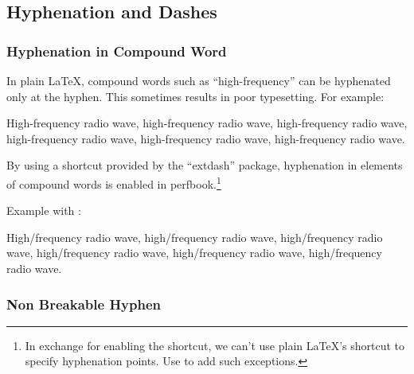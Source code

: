 \subsection{Hyphenation and Dashes}
\label{sec:app:styleguide:Hyphenation and Dashes}

\subsubsection{Hyphenation in Compound Word}
\label{sec:app:styleguide:Hyphenation in Compound Word}

In plain \LaTeX, compound words such as ``high-frequency''
can be hyphenated only at the hyphen. This sometimes results
in poor typesetting. For example:

\begin{center}\begin{minipage}{2.55in}\vspace{0.6\baselineskip}
  High-frequency radio wave, high-frequency radio wave,
  high-frequency radio wave, high-frequency radio wave,
  high-frequency radio wave, high-frequency radio wave.
\vspace{0.6\baselineskip}\end{minipage}\end{center}

By using a shortcut \qco{\\-/} provided by the
``extdash'' package, hyphenation in elements of compound
words is enabled in perfbook.\footnote{
  In exchange for enabling the shortcut, we can't use plain
  \LaTeX's shortcut \qco{\\-} to specify hyphenation points.
  Use  to add such exceptions.
}

Example with \qco{\\-/}:

\begin{center}\begin{minipage}{2.55in}\vspace{0.6\baselineskip}
  High\-/frequency radio wave, high\-/frequency radio wave,
  high\-/frequency radio wave, high\-/frequency radio wave,
  high\-/frequency radio wave, high\-/frequency radio wave.
\vspace{0.6\baselineskip}\end{minipage}\end{center}

\subsubsection{Non Breakable Hyphen}
\label{sec:app:styleguide:Non Breakable Hyphen}

